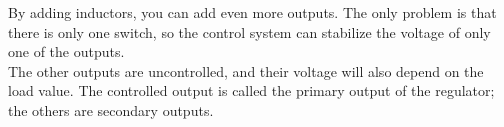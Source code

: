 \documentclass[../main.tex]{subfiles}
\begin{document}
By adding inductors, you can add even more outputs. The only problem is that there is only one switch, so the control system can stabilize the voltage of only one of the outputs. \\

The other outputs are uncontrolled, and their voltage will also depend on the load value. The controlled output is called the primary output of the regulator; the others are secondary outputs.\\
\end{document}
